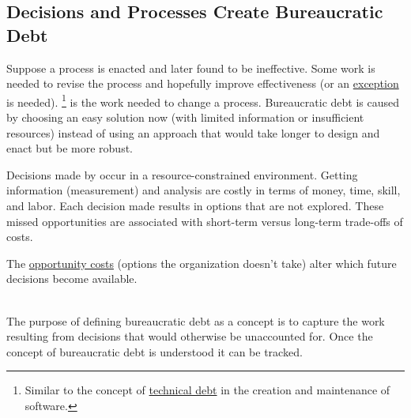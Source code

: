 \subsection*{Decisions and Processes Create Bureaucratic Debt\label{sec:bureaucratic-debt}}


Suppose a \gls{process} is enacted and later found to be ineffective. Some work is needed to revise the process and hopefully improve effectiveness (or an \hyperref[sec:exceptions-to-process]{exception} is needed).
\iftoggle{glossarysubstitutionworks}{\Gls{bureaucratic debt}}{Bureaucratic debt}\footnote{Similar to the concept of 
\href{https://en.wikipedia.org/wiki/Technical_debt}{technical debt} in the creation and maintenance of software\iftoggle{printedonpaper}{; see Wikipedia entry}{}.
} 
is 
\iftoggle{glossaryinmargin}{\marginpar{[Glossary]}}{}  the work needed to change a process.
Bureaucratic debt is caused by choosing an easy solution now (with limited information or insufficient resources) instead of using an approach that would take longer to design and enact but be more robust.


Decisions made by 
\iftoggle{glossarysubstitutionworks}{\glspl{bureaucrat}}{bureaucrats} 
occur in a resource-constrained environment.
Getting information (measurement) and analysis are costly in terms of money, time, skill, and labor.
Each decision made results in options that are not explored. These missed opportunities are associated with short-term versus long-term trade-offs of costs.

The \href{https://en.wikipedia.org/wiki/Opportunity_cost}{opportunity costs}
(options the organization doesn't take) alter which future decisions become available.

\ \\

The purpose of defining bureaucratic debt as a concept is to capture the work resulting from decisions that would otherwise be unaccounted for.
Once the concept of bureaucratic debt is understood it can be tracked.

